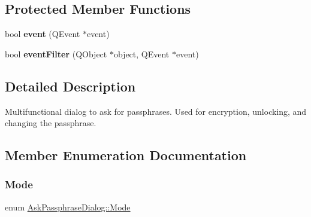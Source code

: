 \subsection*{Protected Member Functions}
\begin{DoxyCompactItemize}
\item 
\mbox{\label{class_ask_passphrase_dialog_ad309d9188638afd3288d0ab40ac3e817}} 
bool {\bfseries event} (Q\+Event $\ast$event)
\item 
\mbox{\label{class_ask_passphrase_dialog_ade161d6ea4bb94248b7e7bc044d1a787}} 
bool {\bfseries event\+Filter} (Q\+Object $\ast$object, Q\+Event $\ast$event)
\end{DoxyCompactItemize}


\subsection{Detailed Description}
Multifunctional dialog to ask for passphrases. Used for encryption, unlocking, and changing the passphrase. 

\subsection{Member Enumeration Documentation}
\mbox{\label{class_ask_passphrase_dialog_a96abf4d3c36c1ef9e268fb546ae76538}} 
\subsubsection{\texorpdfstring{Mode}{Mode}}
{\footnotesize\ttfamily enum \mbox{\hyperlink{class_ask_passphrase_dialog_a96abf4d3c36c1ef9e268fb546ae76538}{Ask\+Passphrase\+Dialog\+::\+Mode}}}

